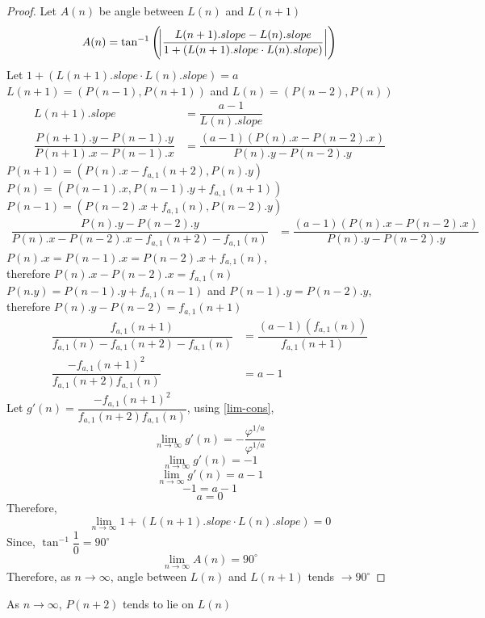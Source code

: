 \documentclass[preprint,12pt]{elsarticle}
\begin{document}
\begin{proof}
	Let $A(n)$ be angle between $L(n)$ and $L(n+1)$
	$$A(n) = \tan^{-1}\left({\abs{\dfrac{L(n+1).slope-L(n).slope}{1+(L(n+1).slope \cdot L(n).slope)}}}\right)$$
	Let $1 + (L(n+1).slope \cdot L(n).slope) = a$\\
	$L(n+1) = (P(n-1), P(n+1))$ and $L(n) = (P(n-2), P(n))$
	\begin{align*}
		L(n+1).slope                                     & = \dfrac{a - 1}{L(n).slope}                       \\
		\dfrac{P(n+1).y - P(n-1).y}{P(n+1).x - P(n-1).x} & = \dfrac{(a-1)(P(n).x-P(n-2).x)}{P(n).y-P(n-2).y} 
	\end{align*}
	$P(n+1) = (P(n).x - f_{a,1}(n+2), P(n).y)$\\
	$P(n) = (P(n-1).x, P(n-1).y+f_{a,1}(n+1))$\\
	$P(n-1) = (P(n-2).x+f_{a,1}(n), P(n-2).y)$
	\begin{align*}
		\dfrac{P(n).y-P(n-2).y}{P(n).x-P(n-2).x-f_{a,1}(n+2)-f_{a,1}(n)} & = \dfrac{(a-1)(P(n).x-P(n-2).x)}{P(n).y-P(n-2).y} 
	\end{align*}
	$P(n).x = P(n-1).x = P(n-2).x+f_{a,1}(n)$,\\ therefore $P(n).x-P(n-2).x=f_{a,1}(n)$\\
	$P(n.y) = P(n-1).y+f_{a,1}(n-1)$ and $P(n-1).y = P(n-2).y$,\\ therefore $P(n).y-P(n-2)=f_{a,1}(n+1)$
	\begin{align*}
		\dfrac{f_{a,1}(n+1)}{f_{a,1}(n)-f_{a,1}(n+2)-f_{a,1}(n)} & = \dfrac{(a-1)(f_{a,1}(n))}{f_{a,1}(n+1)} \\
		\dfrac{-f_{a,1}(n+1)^2}{f_{a,1}(n+2)f_{a,1}(n)}          & = a - 1                                   
	\end{align*}
	Let $g'(n) = \dfrac{-f_{a,1}(n+1)^2}{f_{a,1}(n+2)f_{a,1}(n)}$, using \ref{lim-cons},
	$$\lim_{n \to \infty}g'(n) = -\dfrac{\varphi^{1/a}}{\varphi^{1/a}}$$
	$$\lim_{n \to \infty}g'(n) = -1$$
	$$\lim_{n \to \infty}g'(n) = a - 1$$
	$$-1 = a - 1$$
	$$a = 0$$
	Therefore, $$\lim_{n \to \infty}1 + (L(n+1).slope \cdot L(n).slope) = 0$$
	Since, $\tan^{-1}{\dfrac{1}{0}} = 90^\circ$
	$$\lim_{n \to \infty} A(n) = 90^\circ$$
	Therefore, as $n \to \infty$, angle between $L(n)$ and $L(n+1)$ tends $\to 90^\circ$
\end{proof}

As $n \to \infty$, $P(n+2)$ tends to lie on $L(n)$
\end{document}
